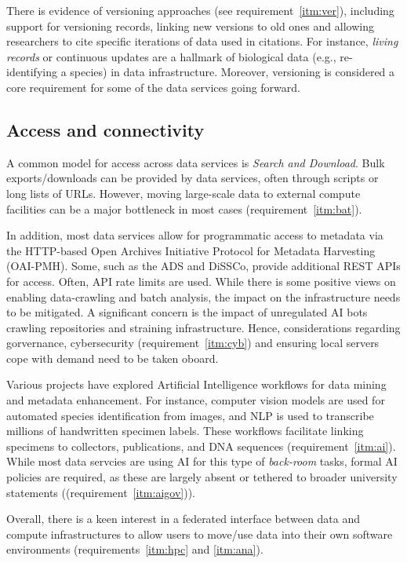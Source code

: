 \documentclass[11pt]{scrartcl}
\begin{document}
There is evidence of versioning approaches (see requirement~\ref{itm:ver}), including support for  versioning  records, linking new versions to old ones and allowing researchers to cite specific iterations of data used in citations. For instance, \emph{living records} or continuous updates are a hallmark of biological data (e.g., re-identifying  a species) in data infrastructure.  Moreover, versioning is considered a core requirement for some of the data services going forward.


\subsection{Access and connectivity}
A common model for access across data services is \emph{Search and Download}. Bulk exports/downloads can be provided by data services, often through scripts or long lists of URLs. 
However, moving large-scale data to external compute facilities can be a major bottleneck in most cases (requirement~\ref{itm:bat}).

In addition, most data services allow for programmatic access to metadata via the HTTP-based Open Archives Initiative Protocol for Metadata Harvesting (OAI-PMH). Some, such as the ADS and DiSSCo, provide additional REST APIs for access. Often, API rate limits are used. While there is some positive views on enabling data-crawling and batch analysis, the impact on the infrastructure needs to be mitigated. A significant concern is the impact of unregulated AI bots crawling repositories and straining infrastructure. Hence, considerations regarding gorvernance, cybersecurity (requirement~\ref{itm:cyb}) and ensuring local servers cope with demand need to be taken oboard.

Various projects have explored Artificial Intelligence workflows for data mining and metadata enhancement. 
For instance, computer vision models are used for automated species identification from images, and NLP is used to transcribe millions of handwritten specimen labels. These workflows facilitate linking specimens to collectors, publications, and DNA sequences (requirement~\ref{itm:ai}). While most data servcies are using AI for this type of \emph{back-room} tasks, formal AI policies are required, as these are largely absent or tethered to broader university statements ((requirement~\ref{itm:aigov})). 

Overall, there is a keen interest in a federated interface between data and compute infrastructures to allow users to move/use data into their own software environments (requirements~\ref{itm:hpc} and \ref{itm:ana}). 
\end{document}
